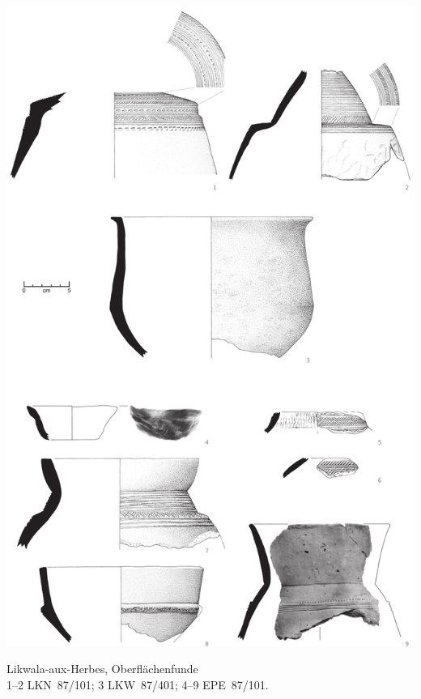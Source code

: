 \begin{pl}[H]
	\includegraphics{plt/Taf87.pdf}
	\vspace{.75em}\caption{Likwala-aux-Herbes, Oberflächenfunde \\ 1--2 LKN~87/101; 3 LKW~87/401; 4--9 EPE~87/101.}
	\label{pl:87}
\end{pl}

